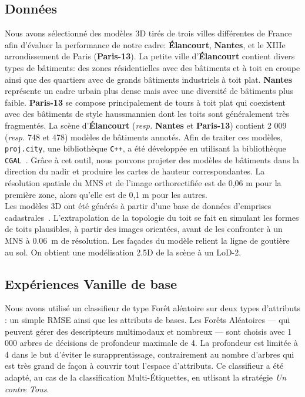     \subsection*{Données}
        Nous avons sélectionné des modèles 3D tirés de trois villes différentes de France afin d'évaluer la performance de notre cadre: \textbf{\'Elancourt}, \textbf{Nantes}, et le XIIIe arrondissement de Paris (\textbf{Paris-13}).
        La petite ville d'\textbf{\'Elancourt} contient divers types de bâtiments: des zones résidentielles avec des bâtiments et à toit en croupe ainsi que des quartiers avec de grands bâtiments industriels à toit plat.
        \textbf{Nantes} représente un cadre urbain plus dense mais avec une diversité de bâtiments plus faible.
        \textbf{Paris-13} se compose principalement de tours à toit plat qui coexistent avec des bâtiments de style haussmannien dont les toits sont généralement très fragmentés.
        La scène d'\textbf{\'Elancourt} (\textit{resp.} \textbf{Nantes} et \textbf{Paris-13}) contient 2 009 (\textit{resp.} 748 et 478) modèles de bâtiments annotés.
        Afin de traiter ces modèles, \verb!proj.city!, une bibliothèque \verb!C++!, a été développée en utilisant la bibliothèque \verb!CGAL!~\parencite{fabri2000design}.
        Grâce à cet outil, nous pouvons projeter des modèles de bâtiments dans la direction du nadir et produire les cartes de hauteur correspondantes.
        La résolution spatiale du MNS et de l'image orthorectifiée est de 0,06 m pour la première zone, alors qu'elle est de 0,1 m pour les autres.\\

        Les modèles 3D ont été générés à partir d'une base de données d'emprises cadastrales~\cite{durupt2006automatic}.
        L'extrapolation de la topologie du toit se fait en simulant les formes de toits plausibles, à partir des images orientées, avant de les confronter à un MNS à \SI{0,06}{\m} de résolution.
        Les façades du modèle relient la ligne de goutière au sol.
        On obtient une modélisation 2.5D de la scène à un LoD-2.

    \subsection*{Expériences Vanille de base}
        Nous avons utilisé un classifieur de type Forêt aléatoire sur deux types d'attributs : un simple RMSE ainsi que les attributs de bases.
        Les Forêts Aléatoires --- qui peuvent gérer des descripteurs multimodaux et nombreux --- sont choisis avec 1 000 arbres de décisions de profondeur maximale de 4.
        La profondeur est limitée à 4 dans le but d'éviter le surapprentissage, contrairement au nombre d'arbres qui est très grand de façon à couvrir tout l'espace d'attributs.
        Ce classifieur a été adapté, au cas de la classification Multi-\'Etiquettes, en utlisant la stratégie \textit{Un contre Tous}.\\

